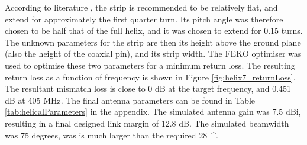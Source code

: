 According to literature \cite{textbook-helicalAntenna}, the strip is recommended to be relatively flat, and extend for approximately the first quarter turn. Its pitch angle was therefore chosen to be half that of the full helix, and it was chosen to extend for $0.15$ turns. The unknown parameters for the strip are then its height above the ground plane (also the height of the coaxial pin), and its strip width. The FEKO optimiser was used to optimise these two parameters for a minimum return loss. The resulting return loss as a function of frequency is shown in Figure \ref{fig:helix7_returnLoss}. The resultant mismatch loss is close to 0 dB at the target frequency, and 0.451 dB at 405 MHz. The final antenna parameters can be found in Table \ref{tab:helicalParameters} in the appendix. The simulated antenna gain was 7.5 dBi, resulting in a final designed link margin of 12.8 dB. The simulated beamwidth was 75 degrees, was is much larger than the required \SI{28}{^\circ}.